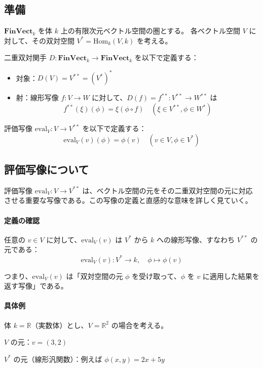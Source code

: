 \documentclass[uplatex,a4j,12pt,dvipdfmx]{jsarticle}
\begin{document}
\subsection{準備}

$\mathbf{FinVect}_k$ を体 $k$ 上の有限次元ベクトル空間の圏とする。
各ベクトル空間 $V$ に対して、その双対空間 $V^* = \mathrm{Hom}_k(V, k)$ を考える。

二重双対関手 $D: \mathbf{FinVect}_k \to \mathbf{FinVect}_k$ を以下で定義する：
\begin{itemize}
	\item 対象：$D(V) = V^{**} = (V^*)^*$
	\item 射：線形写像 $f: V \to W$ に対して、$D(f) = f^{**}: V^{**} \to W^{**}$ は
	      \[
		      f^{**}(\xi)(\phi) = \xi(\phi \circ f) \quad (\xi \in V^{**}, \phi \in W^*)
	      \]
\end{itemize}

評価写像 $\mathrm{eval}_V: V \to V^{**}$ を以下で定義する：
\[
	\mathrm{eval}_V(v)(\phi) = \phi(v) \quad (v \in V, \phi \in V^*)
\]





\subsection{評価写像について}

評価写像 $\mathrm{eval}_V: V \to V^{**}$ は、ベクトル空間の元をその二重双対空間の元に対応させる重要な写像である。この写像の定義と直感的な意味を詳しく見ていく。

\paragraph{定義の確認}
任意の $v \in V$ に対して、$\mathrm{eval}_V(v)$ は $V^*$ から $k$ への線形写像、すなわち $V^{**}$ の元である：
\[
	\mathrm{eval}_V(v): V^* \to k, \quad \phi \mapsto \phi(v)
\]

つまり、$\mathrm{eval}_V(v)$ は「双対空間の元 $\phi$ を受け取って、$\phi$ を $v$ に適用した結果を返す写像」である。

\paragraph{具体例}

体 $k = \mathbb{R}$（実数体）とし、$V = \mathbb{R}^2$ の場合を考える。

$V$ の元：$v = (3, 2)$

$V^*$ の元（線形汎関数）：例えば $\phi(x,y) = 2x + 5y$
\end{document}
